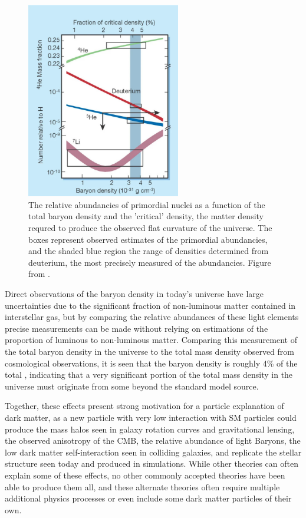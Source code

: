 \begin{figure}[htpb]
	\label{fig:baryogenesis}
	\centering
	\includegraphics[width=0.6\textwidth]{figures/baryogenesis.png}
	\caption[Relative Light Baryon Abundancies]{The relative abundancies of primordial nuclei as a function of the total baryon density and the 'critical' density, the matter density requred to produce the observed flat curvature of the universe. The boxes represent observed estimates of the primordial abundancies, and the shaded blue region the range of densities determined from deuterium, the most precisely measured of the abundancies. Figure from \cite{charbonnel2002}.}
\end{figure}

Direct observations of the baryon density in today's universe have large uncertainties due to the significant fraction of non-luminous matter contained in interstellar gas, but by comparing the relative abundances of these light elements precise measurements can be made without relying on estimations of the proportion of luminous to non-luminous matter.
Comparing this measurement of the total baryon density in the universe to the total mass density observed from cosmological observations, it is seen that the baryon density is roughly 4\% of the total \cite{Tytler_2000}, indicating that a very significant portion of the total mass density in the universe must originate from some beyond the standard model source.

Together, these effects present strong motivation for a particle explanation of dark matter, as a new particle with very low interaction with SM particles could produce the mass halos seen in galaxy rotation curves and gravitational lensing, the observed anisotropy of the CMB, the relative abundance of light Baryons, the low dark matter self-interaction seen in colliding galaxies, and replicate the stellar structure seen today and produced in simulations.
While other theories can often explain some of these effects, no other commonly accepted theories have been able to produce them all, and these alternate theories often require multiple additional physics processes or even include some dark matter particles of their own.


